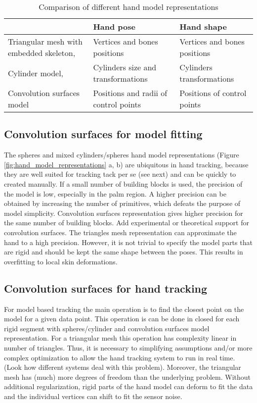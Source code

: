 \begin{table}[!ht] 
	\centering
	\begin{tabular}{|p{2.5cm}|p{2.5cm}|p{2.5cm}|}
	\hline
 	& Hand pose  & Hand shape  \\
	\hline
	Triangular mesh with embedded skeleton, \cite{taylor2014user} & Vertices and bones positions & Vertices and bones positions	 \\
	\hline
	Cylinder model, \cite{tagliasacchi2015robust} & Cylinders size and transformations & Cylinders transformations	 \\
	\hline
	Convolution surfaces model & Positions and radii of control points & Positions of control points \\
	\hline
	\end{tabular}
	\vspace{1em}
	\caption{Comparison of different hand model representations}
	\label{table:representation_dependent_components}
\end{table}

\subsection{Convolution surfaces for model fitting}
The spheres and mixed cylinders/spheres hand model representations (Figure \ref{fig:hand_model_representations} a, b) are ubiquitous in hand tracking, because they are well suited for tracking tack per se (see next) and can be quickly to created manually. If a small number of  building blocks is used, the precision of the model is low, especially in the palm region. A higher precision can be obtained by increasing the number of primitives, which defeats the purpose of model simplicity. Convolution surfaces representation gives higher precision for the same number of building blocks. \textcolor{mygray}{Add experimental or theoretical support for convolution surfaces.}
The triangles mesh representation can approximate the hand to a high precision. However, it is not trivial to specify the model parts that are rigid and should be kept the same shape between the poses. This results in overfitting to local skin deformations. 

\subsection{Convolution surfaces for hand tracking}
For model based tracking the main operation is to find the closest point on the model for a given data point. This operation is can be done in closed for each rigid segment with spheres/cylinder and convolution surfaces model representation. 
For a triangular mesh this operation has complexity linear in number of triangles. Thus, it is necessary to simplifying assumptions and/or more complex optimization to allow the hand tracking system to run in real time. (Look how different systems deal with this problem). Moreover, the triangular mesh has (much) more degrees of freedom than the underlying problem. Without additional regularization, rigid parts of the hand model can deform to fit the data and the individual vertices can shift to fit the sensor noise.

